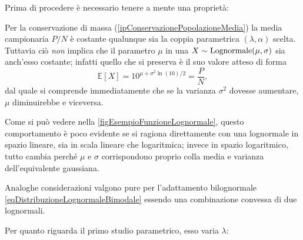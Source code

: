         Prima di procedere è necessario tenere a mente una proprietà:

        \begin{oss}
          \label{ossConservazioneValoreAttesoLognormale}
          Per la conservazione di massa (\cref{ipConservazionePopolazioneMedia}) la media campionaria\footnotemark{} \(P/N\) è costante qualunque sia la coppia parametrica \((\lambda,\alpha)\) scelta. Tuttavia ciò \textit{non} implica che il parametro \(\mu\) in una \(X\sim\operatorname{Lognormale}(\mu,\sigma)\) sia anch'esso costante; infatti quello che si preserva è il suo valore atteso di forma%
          \[
            \mathbb E[X]=10^{\mu+\sigma^2\ln(10)/2}=\frac PN,
          \]
          dal quale si comprende immediatamente che se la varianza \(\sigma^2\) dovesse aumentare, \(\mu\) diminuirebbe e viceversa.
          
          Come si può vedere nella \cref{figEsempioFunzioneLognormale}, questo comportamento è poco evidente se si ragiona direttamente con una lognormale in spazio lineare, sia in scala lineare che logaritmica; invece in spazio logaritmico, tutto cambia perché \(\mu\) e \(\sigma\) corrispondono proprio colla media e varianza dell'equivalente gaussiana.
          
          Analoghe considerazioni valgono pure per l'adattamento bilognormale \cref{eqDistribuzioneLognormaleBimodale} essendo una combinazione convessa di due lognormali.
        \end{oss}

        Per quanto riguarda il primo studio parametrico, esso varia \(\lambda\):


